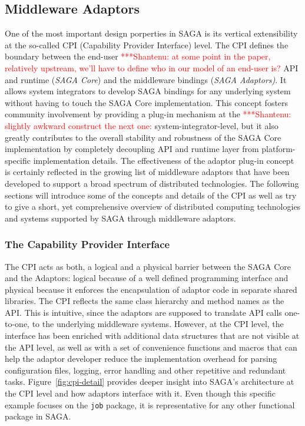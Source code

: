 \documentclass[a4paper,10pt]{article}
\newcommand{\jhanote}[1]{  {\textcolor{red}     { ***Shantenu: #1 }}}
\newcommand{\jhanote}[1]{}
\begin{document}
 
\subsection{Middleware Adaptors}

 One of the most important design porperties in SAGA is its vertical
 extensibility at the so-called CPI (Capability Provider Interface)
 level.  The CPI defines the boundary between the end-user \jhanote{at
   some point in the paper, relatively upstream, we'll have to define
   who in our model of an end-user is?} API and runtime (\textit{SAGA
   Core}) and the middleware bindings (\textit{SAGA Adaptors)}.  It
 allows system integrators to develop SAGA bindings for any underlying
 system without having to touch the SAGA Core implementation.  This
 concept fosters community involvement by providing a plug-in
 mechanism at the \jhanote{slightly awkward construct the next one:}
 system-integrator-level, but it also greatly contributes to the
 overall stability and robustness of the SAGA Core implementation by
 completely decoupling API and runtime layer from platform-specific
 implementation details.  The effectiveness of the adaptor plug-in
 concept is certainly reflected in the growing list of middleware
 adaptors that have been developed to support a broad spectrum of
 distributed technologies. The following sections will introduce some
 of the concepts and details of the CPI as well as try to give a
 short, yet comprehensive overview of distributed computing
 technologies and systems supported by SAGA through middleware
 adaptors.
 
 \subsubsection{The Capability Provider Interface}
 
 The CPI acts as both, a logical and a physical barrier between the
 SAGA Core and the Adaptors: logical because of a well defined
 programming interface and physical because it enforces the
 encapsulation of adaptor code in separate shared libraries. The CPI
 reflects the same class hierarchy and method names as the API. This
 is intuitive, since the adaptors are supposed to translate API calls
 one-to-one, to the underlying middleware systems.  However, at the
 CPI level, the interface has been enriched with additional data
 structures that are not visible at the API level, as well as with a
 set of convenience functions and macros that can help the adaptor
 developer reduce the implementation overhead for parsing
 configuration files, logging, error handling and other repetitive and
 redundant tasks.  Figure~\ref{fig:cpi-detail} provides deeper insight
 into SAGA's architecture at the CPI level and how adaptors interface
 with it. Even though this specific example focuses on the
 \texttt{job} package, it is representative for any other functional
 package in SAGA.
 
\end{document}
